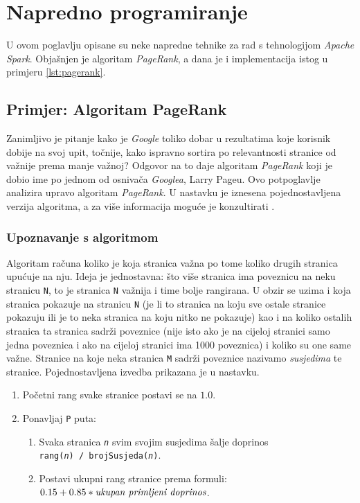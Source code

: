 \documentclass[times, utf8, zavrsni, numeric]{fer}
\begin{document}
\chapter{Napredno programiranje}
U ovom poglavlju opisane su neke napredne tehnike za rad s tehnologijom \emph{Apache Spark}. Objašnjen je algoritam \emph{PageRank}, a dana je i implementacija istog u primjeru \ref{lst:pagerank}.
\section{Primjer: Algoritam PageRank} \label{algoritamPageRank}
Zanimljivo je pitanje kako je \emph{Google} toliko dobar u rezultatima koje korisnik dobije na svoj upit, točnije, kako ispravno sortira po relevantnosti stranice od važnije prema manje važnoj? Odgovor na to daje algoritam \emph{PageRank} koji je dobio ime po jednom od osnivača \emph{Googlea}, Larry Pageu. Ovo potpoglavlje analizira upravo algoritam \emph{PageRank}. U nastavku je iznesena pojednostavljena verzija algoritma, a za više informacija moguće je konzultirati \cite{pageRank}.

\subsection{Upoznavanje s algoritmom}
Algoritam računa koliko je koja stranica važna po tome koliko drugih stranica upućuje na nju. Ideja je jednostavna: što više stranica ima poveznicu na neku stranicu \texttt{N}, to je stranica \texttt{N} važnija i time bolje rangirana. U obzir se uzima i koja stranica pokazuje na stranicu \texttt{N} (je li to stranica na koju sve ostale stranice pokazuju ili je to neka stranica na koju nitko ne pokazuje) kao i na koliko ostalih stranica ta stranica sadrži poveznice (nije isto ako je na cijeloj stranici samo jedna poveznica i ako na cijeloj stranici ima 1000 poveznica) i koliko su one same važne. Stranice na koje neka stranica \texttt{M} sadrži poveznice nazivamo \emph{susjedima} te stranice.
Pojednostavljena izvedba prikazana je u nastavku.

\newpage
\begin{enumerate}[label*=\arabic*.]
\item Početni rang svake stranice postavi se na $1.0$.
\item Ponavljaj \texttt{P} puta:
\begin{enumerate}[label*=\arabic*.]
\item Svaka stranica \texttt{\emph{n}} svim svojim susjedima šalje doprinos\\ \texttt{rang(\emph{n}) / brojSusjeda(\emph{n})}.
\item Postavi ukupni rang stranice prema formuli:\\ $0.15 + 0.85*\emph{ukupan primljeni doprinos}$.
\end{enumerate}
\end{enumerate}
\end{document}
